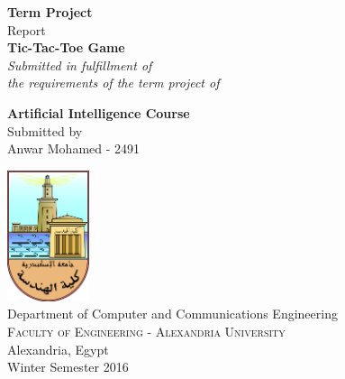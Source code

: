 \begin{titlepage}

\begin{center}

\textup{\small {\bf Term Project} \\ Report}\\[0.2in]

\Large \textbf {Tic-Tac-Toe Game}\\[0.5in]

       \small \emph{Submitted in fulfillment of\\
        the requirements of the term project of}
        \vspace{.2in}

       {\bf Artificial Intelligence Course}\\[0.5in]

\normalsize Submitted by \\
\normalsize Anwar Mohamed - 2491 \\


\vfill

\includegraphics[width=0.18\textwidth]{./foe-logo}\\[0.1in]
\Large{Department of Computer and Communications Engineering}\\
\normalsize
\textsc{Faculty of Engineering - Alexandria University}\\
Alexandria, Egypt\\
\vspace{0.2cm}
Winter Semester 2016

\end{center}

\end{titlepage}
